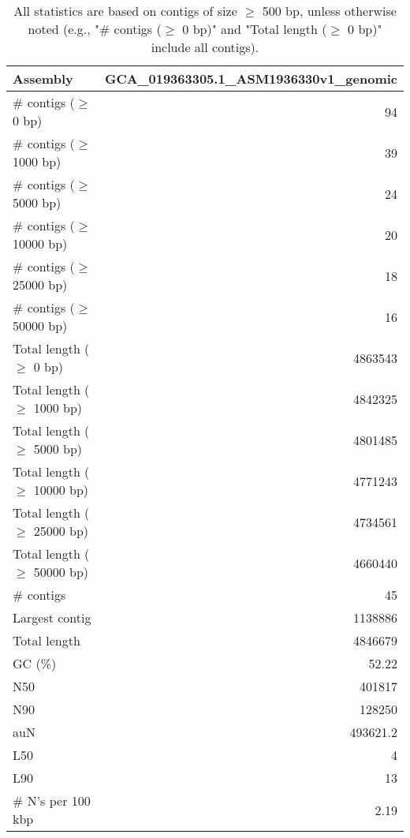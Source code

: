 \documentclass[12pt,a4paper]{article}
\begin{document}
\begin{table}[ht]
\begin{center}
\caption{All statistics are based on contigs of size $\geq$ 500 bp, unless otherwise noted (e.g., "\# contigs ($\geq$ 0 bp)" and "Total length ($\geq$ 0 bp)" include all contigs).}
\begin{tabular}{|l*{1}{|r}|}
\hline
Assembly & GCA\_019363305.1\_ASM1936330v1\_genomic \\ \hline
\# contigs ($\geq$ 0 bp) & 94 \\ \hline
\# contigs ($\geq$ 1000 bp) & 39 \\ \hline
\# contigs ($\geq$ 5000 bp) & 24 \\ \hline
\# contigs ($\geq$ 10000 bp) & 20 \\ \hline
\# contigs ($\geq$ 25000 bp) & 18 \\ \hline
\# contigs ($\geq$ 50000 bp) & 16 \\ \hline
Total length ($\geq$ 0 bp) & 4863543 \\ \hline
Total length ($\geq$ 1000 bp) & 4842325 \\ \hline
Total length ($\geq$ 5000 bp) & 4801485 \\ \hline
Total length ($\geq$ 10000 bp) & 4771243 \\ \hline
Total length ($\geq$ 25000 bp) & 4734561 \\ \hline
Total length ($\geq$ 50000 bp) & 4660440 \\ \hline
\# contigs & 45 \\ \hline
Largest contig & 1138886 \\ \hline
Total length & 4846679 \\ \hline
GC (\%) & 52.22 \\ \hline
N50 & 401817 \\ \hline
N90 & 128250 \\ \hline
auN & 493621.2 \\ \hline
L50 & 4 \\ \hline
L90 & 13 \\ \hline
\# N's per 100 kbp & 2.19 \\ \hline
\end{tabular}
\end{center}
\end{table}
\end{document}
